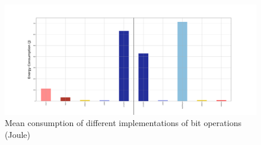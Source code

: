 \begin{figure}
    \centering
    \includegraphics[width=\linewidth]{imgs/bitopts_mean}
    \caption{Mean consumption of different implementations of bit operations (Joule) }
    \label{fig:bitops}
\end{figure}

